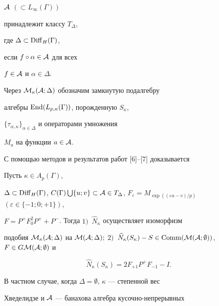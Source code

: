 ${\cal A}$ $(\subset L_\infty (\Gamma))$


принадлежит классу $T_\Delta$,


где $\Delta\subset \operatorname{Diff}_H(\Gamma)$,


если $f\circ\alpha\in {\cal A}$ для всех


$f\in {\cal A}$ и $\alpha\in\Delta$.


Через ${\cal M}_{\kappa} ({\cal A};\Delta)$ обозначим замкнутую подалгебру


алгебры $\operatorname{End}(L_{p,\kappa}(\Gamma))$, порожденную $S_\kappa$,


$\{\tau_{\alpha,\kappa}\}_{\alpha\in\Delta}$ и операторами умножения


$M_a$ на функции $a \in {\cal A}$.





С помощью методов и результатов работ [6]--[7] доказывается





\begin{thm} Пусть $\kappa\in A_p(\Gamma)$,


$\Delta\subset \Diff_H(\Gamma)$, $C(\Gamma)\bigcup \{u;v\}


\subset {\cal A}\in T_\Delta $, $F_\varepsilon =


M_{\exp ((\varepsilon u-v)/p)}$ $(\varepsilon\in\{-1;0;+1\})$,


$F=P^+F^2_0P^++P^-$. Тогда $1)$~$\widehat{N}_\kappa$ осуществляет изоморфизм


подобия ${\cal M}_\kappa ({\cal A};\Delta)$ на ${\cal M} ({\cal A};


\Delta);$ $2)$~$\widehat{N}_\kappa (S_\kappa)-S\in \Comm


({\cal M} ({\cal A};\emptyset))$, $F\in G{\cal M} ({\cal A};\emptyset)$ и


\begin{equation}


\widehat{N}_\kappa (S_\kappa)=2F_{+1}P^+F_{-1}-I.


\end{equation}


\end{thm}





В частном случае, когда $\Delta =\emptyset$, $\kappa$ --- степенной вес


Хведелидзе и ${\cal A}$ --- банахова алгебра кусочно-непрерывных


